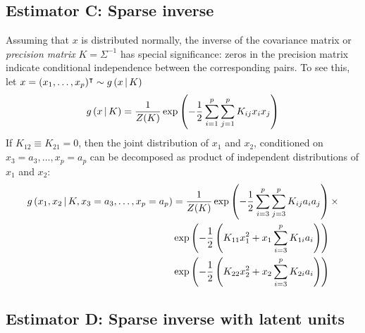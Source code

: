 \subsection*{Estimator C: Sparse inverse}
Assuming that $x$ is distributed normally, the inverse of the covariance matrix or \emph{precision matrix} $K=\Sigma^{-1}$ has special significance: zeros in the precision matrix indicate conditional independence between the corresponding pairs. To see this, let $x=(x_1,\ldots,x_p)^\intercal \sim g\left(x\,\vert\, K\right)$
\begin{equation}
g\left(x\,\vert\, K\right) = \frac 1 {Z(K)} \exp\left(-\frac 1 2 \sum\limits_{i=1}^p\sum\limits_{j=1}^p  K_{ij} x_i x_j\right)
\end{equation} 
If $K_{12}\equiv K_{21} = 0$, then the joint distribution of $x_1$ and $x_2$, conditioned on $x_3=a_3,\ldots,x_p=a_p$ can be decomposed as product of independent distributions of $x_1$ and $x_2$: 
\begin{equation}
\begin{split}
g\left( x_1, x_2 \,\vert\, K, x_3=a_3,\ldots,x_p=a_p\right) &=
\frac 1 {Z(K)} \exp\left(-\frac 1 2 \sum\limits_{i=3}^p\sum\limits_{j=3}^p  K_{ij} a_i a_j \right)\times
\\
 &  \exp\left( -\frac 1 2\left( K_{11} x_1^2 +  x_1\sum\limits_{i=3}^p K_{1i}a_i \right)  \right)
\\
 &  \exp\left( -\frac 1 2\left( K_{22} x_2^2 +  x_2\sum\limits_{i=3}^p K_{2i}a_i \right)  \right)
\end{split}
\end{equation}


\cite{Dempster:1972,Meinshausen:2006,Friedman:2008}

\subsection*{Estimator D: Sparse inverse with latent units}
\cite{Ma:2013} 

